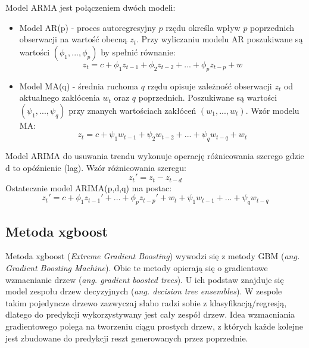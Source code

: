 \documentclass[11pt]{report}
\begin{document}
Model ARMA jest połączeniem dwóch modeli:
\begin{itemize}
\item Model AR(p) - proces autoregresyjny $p$ rzędu określa wpływ $p$ poprzednich obserwacji na wartość obecną $z_t$.
Przy wyliczaniu modelu AR poszukiwane są wartości $(\phi_1, ..., \phi_p)$ by spełnić równanie\cite{armia_s_zajac}:
\begin{equation}
    z_t = c + \phi_1 z_{t-1} + \phi_2 z_{t-2} + ... + \phi_p z_{t-p}+w
\end{equation}


\item Model MA(q) - średnia ruchoma $q$ rzędu opisuje zależność obserwacji $z_t$ od aktualnego zakłócenia $w_t$ oraz $q$ poprzednich.  Poszukiwane są wartości $(\psi_1, ..., \psi_q)$ przy znanych wartościach zakłóceń $(w_1, ..., w_t)$. Wzór modelu MA\cite{armia_s_zajac}: 
\begin{equation}
    z_t = c + \psi_1 w_{t-1} + \psi_2 w_{t-2} + ... + \psi_q w_{t-q} + w_t
\end{equation}
\end{itemize}

Model ARIMA do usuwania trendu wykonuje operację różnicowania szerego gdzie d to opóźnienie (lag). Wzór różnicowania szeregu\cite{armia_s_zajac}:
\begin{equation}
    z_{t}'=z_t-z_{t-d}
\end{equation}
Ostatecznie model ARIMA(p,d,q) ma postac\cite{armia_s_zajac}:
\begin{equation}
    z_t' = c + \phi_1 z_{t-1}' + ... + \phi_p z_{t-p}' + w_t + \psi_1 w_{t-1} + ... + \psi_q w_{t-q}
\end{equation}


\subsection{Metoda xgboost}
Metoda xgboost (\textit{Extreme Gradient Boosting}) wywodzi się z metody GBM (\textit{ang. Gradient Boosting Machine}).
Obie te metody opierają się o gradientowe wzmacnianie drzew (\textit{ang. gradient boosted trees}).
U ich podstaw znajduje się model zespołu drzew decyzyjnych (\textit{ang. decision tree ensembles}).
W zespole takim pojedyncze drzewo zazwyczaj słabo radzi sobie z klasyfikacją/regresją, dlatego do predykcji wykorzystywany jest cały zespół drzew.
Idea wzmacniania gradientowego polega na tworzeniu ciągu prostych drzew, z których każde kolejne jest zbudowane do predykcji reszt generowanych przez poprzednie.
\end{document}
